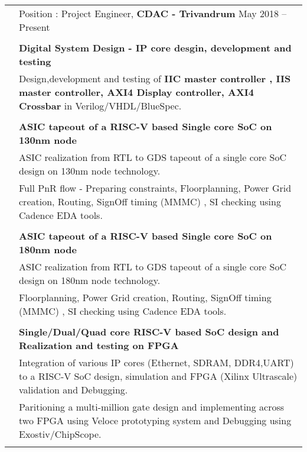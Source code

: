 \documentclass[letterpaper, 11pt]{article}
\begin{document}
\begin{longtable}{p{1.3in}p{4.8in}}







\nohyphens{\color{OliveGreen}{Work Experience}} 
& Position : Project Engineer, \textbf{CDAC - Trivandrum}  \hfill May 2018 -- Present \\
&  \\

& \textbf{Digital System Design - IP core desgin, development and testing} \\
& Design,development and testing of {\textbf{IIC master controller , IIS master controller, AXI4 Display controller, AXI4 Crossbar}} in Verilog/VHDL/BlueSpec.\\
& \\

& \textbf{ASIC tapeout of a RISC-V based Single core SoC on 130nm node} \\
& ASIC realization from RTL to GDS tapeout of a single core SoC design on 130nm node technology.\\
& Full PnR flow - Preparing constraints, Floorplanning, Power Grid creation, Routing, SignOff timing (MMMC) , SI checking using Cadence EDA tools.  \\
& \\

& \textbf{ASIC tapeout of a RISC-V based Single core SoC on 180nm node} \\
& ASIC realization from RTL to GDS tapeout of a single core SoC design on 180nm node technology.\\
& Floorplanning, Power Grid creation, Routing, SignOff timing (MMMC) , SI checking using Cadence EDA tools.  \\
& \\


& \textbf{Single/Dual/Quad core RISC-V based SoC design and Realization and testing on FPGA} \\
& Integration of various IP cores (Ethernet, SDRAM, DDR4,UART) to a RISC-V SoC design, simulation and FPGA (Xilinx Ultrascale) validation and Debugging.  \\
& Paritioning a multi-million gate design and implementing across two FPGA using  Veloce prototyping system and Debugging using Exostiv/ChipScope. \\
& \\



\end{longtable}
\end{document}
